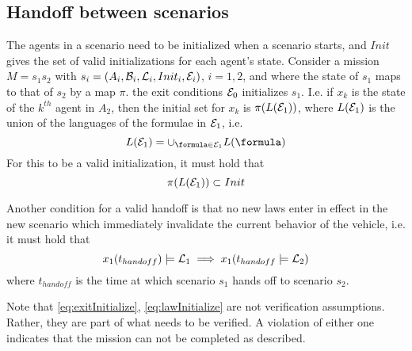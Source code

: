 \subsection{Handoff between scenarios}
\label{scenarioHandoff}

The agents in a scenario need to be initialized when a scenario starts, and $Init$ gives the set of valid initializations for each agent's state.
Consider a mission $M = s_1 s_2$ with $s_i = (A_i,\mathcal{B}_i, \mathcal{L}_i, Init_i, \mathcal{E}_i)$, $i=1,2$,
and where the state of $s_1$ maps to that of $s_2$ by a map $\pi$.
the exit conditions $\mathcal{E}_0$ initializes $s_1$. 
I.e. if $x_k$ is the state of the $k^{th}$ agent in $A_2$, then the initial set for $x_k$ is $\pi(L(\mathcal{E}_1))$,
where $L(\mathcal{E}_1)$ is the union of the languages of the formulae in $\mathcal{E}_1$, i.e. 
\[L(\exitConditions_1) = \cup_{\formula \in \exitConditions_1}L(\formula)\]
For this to be a valid initialization, it must hold that 
\begin{equation}
\label{eq:exitInitialize}
\pi(L(\mathcal{E}_1)) \subset Init
\end{equation}

Another condition for a valid handoff is that no new laws enter in effect in the new scenario which immediately invalidate the current behavior of the vehicle, i.e. it must hold that 
\begin{equation}
\label{eq:lawInitialize}
x_1(t_{handoff}) \models \mathcal{L}_1 \implies x_1(t_{handoff} \models \mathcal{L}_2)
\end{equation}
where $t_{handoff}$ is the time at which scenario $s_1$ hands off to scenario $s_2$.

Note that \eqref{eq:exitInitialize}, \eqref{eq:lawInitialize} are not verification assumptions.
Rather, they are part of what needs to be verified. 
A violation of either one indicates that the mission can not be completed as described.

\begin{exmp}
	
	\end{exmp}
